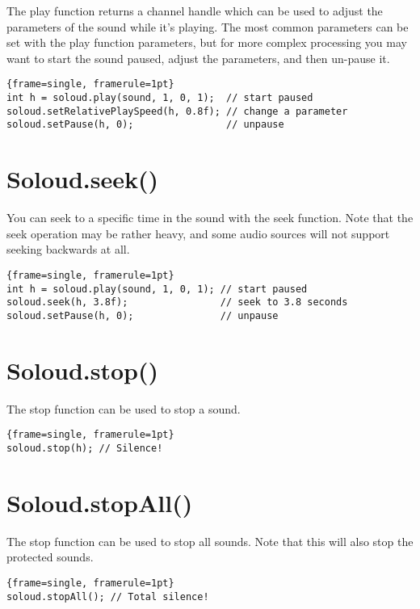 The play function returns a channel handle which can be used to adjust the parameters of the sound while it's playing. The most common parameters can be set with the play function parameters, but for more complex processing you may want to start the sound paused, adjust the parameters, and then un-pause it.

\begin{lstlisting}{frame=single, framerule=1pt}
int h = soloud.play(sound, 1, 0, 1);  // start paused
soloud.setRelativePlaySpeed(h, 0.8f); // change a parameter
soloud.setPause(h, 0);                // unpause
\end{lstlisting}

\section{Soloud.seek()}

You can seek to a specific time in the sound with the seek function. Note that the seek operation may be rather heavy, and some audio sources will not support seeking backwards at all.

\begin{lstlisting}{frame=single, framerule=1pt}
int h = soloud.play(sound, 1, 0, 1); // start paused
soloud.seek(h, 3.8f);                // seek to 3.8 seconds
soloud.setPause(h, 0);               // unpause
\end{lstlisting}

\section{Soloud.stop()}

The stop function can be used to stop a sound.

\begin{lstlisting}{frame=single, framerule=1pt}
soloud.stop(h); // Silence!
\end{lstlisting}

\section{Soloud.stopAll()}

The stop function can be used to stop all sounds. Note that this will also stop the protected sounds.

\begin{lstlisting}{frame=single, framerule=1pt}
soloud.stopAll(); // Total silence!
\end{lstlisting}

